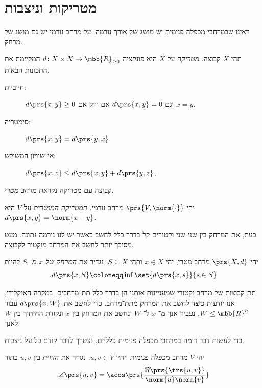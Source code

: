 \documentclass[a4paper,10pt,twoside,openany]{book}
\begin{document}
\section{מטריקות וניצבות}

ראינו שבמרחבי מכפלה פנימית יש מושג של אורך%
\textemdash
נורמה.
על מרחב נורמי יש גם מושג של מרחק.

\begin{definition}[מטריקה]
תהי
$X$
קבוצה.
\emph{מטריקה}
על
$X$
היא פונקציה
$d \colon X \times X \to \mbb{R}_{\geq 0}$
המקיימת את התכונות הבאות.
\begin{description}
\item[חיוביות:]
$d\prs{x,y} \geq 0$
וגם
$d\prs{x,y} = 0$
אם ורק אם
$x = y$.

\item[סימטריה:]
$d\prs{x,y} = d\prs{y,x}$.

\item[אי־שוויון המשולש:]
$d\prs{x,z} \leq d\prs{x,y} + d\prs{y,z}$.
\end{description}

קבוצה עם מטריקה נקראת
\emph{מרחב מטרי}.
\end{definition}

\begin{definition}
יהי
$\prs{V,\norm{\cdot}}$
מרחב נורמי.
\emph{המטריקה המושרית}
על
$V$
היא
$d\prs{x,y} = \norm{x-y}$.
\end{definition}

כעת, את המרחק בין שני שני וקטורים קל בדרך כלל לחשב כאשר יש לנו נורמה נתונה. מעט מסובך יותר לחשב את המרחב מוקטור לקבוצה.

\begin{definition}
יהי
$\prs{X,d}$
מרחב מטרי, יהי
$x \in X$
ותהי
$S \subseteq X$.
נגדיר את
\emph{המרחק של
$x$
מ־%
$S$}
להיות
\begin{align*}
\text{.} d\prs{x,S} \coloneqq \inf\set{d\prs{x,s}}{s \in S}
\end{align*}
\end{definition}

תת־קבוצות של מרחב וקטורי שמעניינות אותנו הן בדרך כלל תת־מרחבים. במקרה האוקלידי, אנו יודעות כיצד לחשב את המרחק מתת־מרחב. כדי לחשב את
$d\prs{x,W}$
עבור
$W \leq \mbb{R}^n$,
נעביר אנך מ־%
$x$
ל־%
$W$
ונחשב את המרחק בין
$x$
ונקודת החיתוך בין
$W$
לאנך.

כדי לעשות דבר דומה במרחבי מכפלה פנימית כלליים, נצטרך לדבר קודם כל על ניצבות.

\begin{definition}
יהי
$V$
מרחב מכפלה פנימית ויהיו
$u,v \in V$.
נגדיר את
\emph{הזווית}
בין
$u,v$
בתור
\[\text{.} \angle\prs{u,v} = \acos\prs{{\frac{\Re\prs{\trs{u,v}}}{\norm{u} \norm{v}}}}\]
\end{definition}
\end{document}
